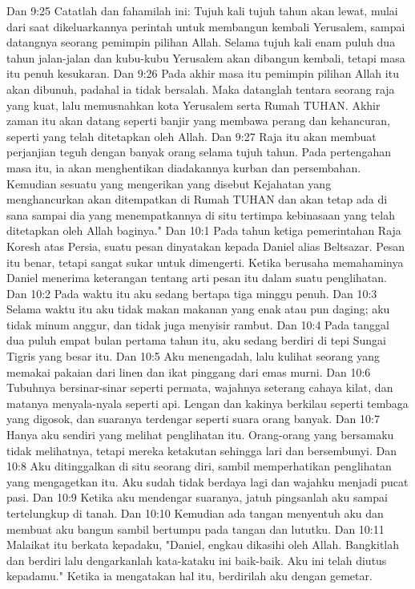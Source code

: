 Dan 9:25  Catatlah dan fahamilah ini: Tujuh kali tujuh tahun akan lewat, mulai dari saat dikeluarkannya perintah untuk membangun kembali Yerusalem, sampai datangnya seorang pemimpin pilihan Allah. Selama tujuh kali enam puluh dua tahun jalan-jalan dan kubu-kubu Yerusalem akan dibangun kembali, tetapi masa itu penuh kesukaran.
Dan 9:26  Pada akhir masa itu pemimpin pilihan Allah itu akan dibunuh, padahal ia tidak bersalah. Maka datanglah tentara seorang raja yang kuat, lalu memusnahkan kota Yerusalem serta Rumah TUHAN. Akhir zaman itu akan datang seperti banjir yang membawa perang dan kehancuran, seperti yang telah ditetapkan oleh Allah.
Dan 9:27  Raja itu akan membuat perjanjian teguh dengan banyak orang selama tujuh tahun. Pada pertengahan masa itu, ia akan menghentikan diadakannya kurban dan persembahan. Kemudian sesuatu yang mengerikan yang disebut Kejahatan yang menghancurkan akan ditempatkan di Rumah TUHAN dan akan tetap ada di sana sampai dia yang menempatkannya di situ tertimpa kebinasaan yang telah ditetapkan oleh Allah baginya."
Dan 10:1  Pada tahun ketiga pemerintahan Raja Koresh atas Persia, suatu pesan dinyatakan kepada Daniel alias Beltsazar. Pesan itu benar, tetapi sangat sukar untuk dimengerti. Ketika berusaha memahaminya Daniel menerima keterangan tentang arti pesan itu dalam suatu penglihatan.
Dan 10:2  Pada waktu itu aku sedang bertapa tiga minggu penuh.
Dan 10:3  Selama waktu itu aku tidak makan makanan yang enak atau pun daging; aku tidak minum anggur, dan tidak juga menyisir rambut.
Dan 10:4  Pada tanggal dua puluh empat bulan pertama tahun itu, aku sedang berdiri di tepi Sungai Tigris yang besar itu.
Dan 10:5  Aku menengadah, lalu kulihat seorang yang memakai pakaian dari linen dan ikat pinggang dari emas murni.
Dan 10:6  Tubuhnya bersinar-sinar seperti permata, wajahnya seterang cahaya kilat, dan matanya menyala-nyala seperti api. Lengan dan kakinya berkilau seperti tembaga yang digosok, dan suaranya terdengar seperti suara orang banyak.
Dan 10:7  Hanya aku sendiri yang melihat penglihatan itu. Orang-orang yang bersamaku tidak melihatnya, tetapi mereka ketakutan sehingga lari dan bersembunyi.
Dan 10:8  Aku ditinggalkan di situ seorang diri, sambil memperhatikan penglihatan yang mengagetkan itu. Aku sudah tidak berdaya lagi dan wajahku menjadi pucat pasi.
Dan 10:9  Ketika aku mendengar suaranya, jatuh pingsanlah aku sampai tertelungkup di tanah.
Dan 10:10  Kemudian ada tangan menyentuh aku dan membuat aku bangun sambil bertumpu pada tangan dan lututku.
Dan 10:11  Malaikat itu berkata kepadaku, "Daniel, engkau dikasihi oleh Allah. Bangkitlah dan berdiri lalu dengarkanlah kata-kataku ini baik-baik. Aku ini telah diutus kepadamu." Ketika ia mengatakan hal itu, berdirilah aku dengan gemetar.

